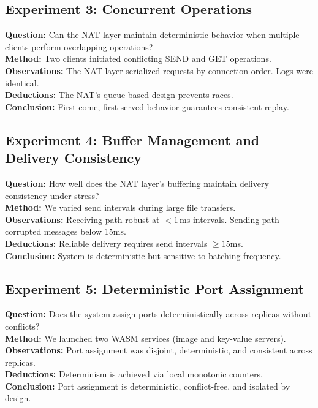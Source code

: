 \documentclass[10pt, 
]{IEEEtran}
\begin{document}
\subsection{Experiment 3: Concurrent Operations}
\textbf{Question:} Can the NAT layer maintain deterministic behavior when multiple clients perform overlapping operations? \\ 
\textbf{Method:} Two clients initiated conflicting SEND and GET operations. \\ 
\textbf{Observations:} The NAT layer serialized requests by connection order. Logs were identical. \\ 
\textbf{Deductions:} The NAT's queue-based design prevents races. \\ 
\textbf{Conclusion:} First-come, first-served behavior guarantees consistent replay.

\subsection{Experiment 4: Buffer Management and Delivery Consistency}
\textbf{Question:} How well does the NAT layer’s buffering maintain delivery consistency under stress? \\ 
\textbf{Method:} We varied send intervals during large file transfers. \\ 
\textbf{Observations:} Receiving path robust at \( < 1\,\text{ms} \) intervals. Sending path corrupted messages below 15ms. \\ 
\textbf{Deductions:} Reliable delivery requires send intervals \( \geq 15 \)ms. \\ 
\textbf{Conclusion:} System is deterministic but sensitive to batching frequency.

\subsection{Experiment 5: Deterministic Port Assignment}
\textbf{Question:} Does the system assign ports deterministically across replicas without conflicts? \\ 
\textbf{Method:} We launched two WASM services (image and key-value servers). \\ 
\textbf{Observations:} Port assignment was disjoint, deterministic, and consistent across replicas. \\ 
\textbf{Deductions:} Determinism is achieved via local monotonic counters. \\ 
\textbf{Conclusion:} Port assignment is deterministic, conflict-free, and isolated by design.
\end{document}
